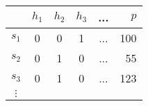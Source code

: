 \begin{tabular}{|c|cccc|r|}
  \hline
  & $h_1$ & $h_2$ & $h_3$ & ... & $p$\\\hline
  $s_1$ & 0 & 0 & 1 & ... & 100\\
  $s_2$ & 0 & 1 & 0 & ... & 55\\
  $s_3$ & 0 & 1 & 0 & ... & 123\\
  $\vdots$ &&&&&\\\hline
\end{tabular}
